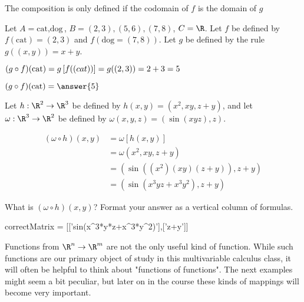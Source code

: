 \begin{warning}
	The composition is only defined if the codomain of $f$ is the domain of $g$
\end{warning}

\begin{question}
		Let $A = {\text{cat},\text{dog}}$, $B = {(2,3),(5,6),(7,8)}$, $C = \R$. Let $f$ be defined by $f(\text{cat}) = (2,3)$ and $f(\text{dog} = (7,8))$.  Let $g$ be defined by
		the rule $g((x,y)) = x+y$.  
		\begin{solution}
			\begin{hint}
				$(g \circ f)(\text{cat}) = g\left[f(\text(cat))\right] =g((2,3)) = 2+3=5$
			\end{hint}
			 $(g \circ f)(\text{cat}) = \answer{5}$
		\end{solution} 
\end{question}

\begin{question}
	Let $h: \R^2 \to \R^3$ be defined by $h(x,y) = (x^2,xy,z+y)$, and let $\omega: \R^3 \to \R^2$ be defined by $\omega(x,y,z) = (\sin(xyz),z)$.
	\begin{solution}
		\begin{hint}
			\begin{align*}
			(\omega\circ h)(x,y) &= \omega\left[h(x,y)\right]\\
			&= \omega(x^2,xy,z+y)\\
			&= (\sin((x^2)(xy)(z+y)), z+y)\\
			&=(\sin(x^3yz+x^3y^2),z+y)
			\end{align*}
		\end{hint}
		What is $(\omega\circ h)(x,y)$?  Format your answer as a vertical column of formulas.
		\begin{matrix-answer}
			correctMatrix = [['sin(x^3*y*z+x^3*y^2)'],['z+y']]
		\end{matrix-answer}
	\end{solution}
\end{question}

Functions from $\R^n \to \R^m$ are not the only useful kind of function.  While such functions are our primary object of study in 
this multivariable calculus class,  it will often be helpful to think about "functions of functions".  The next examples might seem a 
bit peculiar, but later on in the course these kinds of mappings will become very important.


